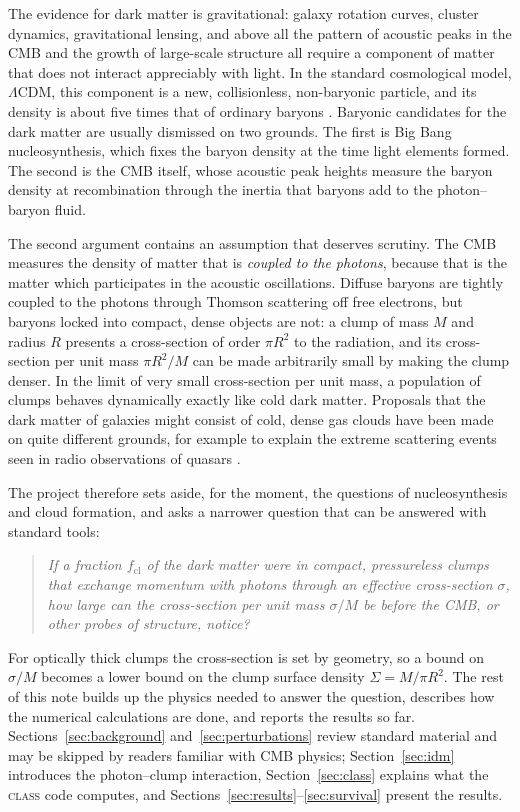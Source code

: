 \documentclass[11pt,a4paper]{article}
\newcommand{\cl}{\mathrm{cl}}
\begin{document}
The evidence for dark matter is gravitational: galaxy rotation curves, cluster dynamics, gravitational lensing, and above all the pattern of acoustic peaks in the CMB and the growth of large-scale structure all require a component of matter that does not interact appreciably with light. In the standard cosmological model, $\Lambda$CDM, this component is a new, collisionless, non-baryonic particle, and its density is about five times that of ordinary baryons \citep{Planck2018}. Baryonic candidates for the dark matter are usually dismissed on two grounds. The first is Big Bang nucleosynthesis, which fixes the baryon density at the time light elements formed. The second is the CMB itself, whose acoustic peak heights measure the baryon density at recombination through the inertia that baryons add to the photon--baryon fluid.

The second argument contains an assumption that deserves scrutiny. The CMB measures the density of matter that is \emph{coupled to the photons}, because that is the matter which participates in the acoustic oscillations. Diffuse baryons are tightly coupled to the photons through Thomson scattering off free electrons, but baryons locked into compact, dense objects are not: a clump of mass $M$ and radius $R$ presents a cross-section of order $\pi R^2$ to the radiation, and its cross-section per unit mass $\pi R^2/M$ can be made arbitrarily small by making the clump denser. In the limit of very small cross-section per unit mass, a population of clumps behaves dynamically exactly like cold dark matter. Proposals that the dark matter of galaxies might consist of cold, dense gas clouds have been made on quite different grounds, for example to explain the extreme scattering events seen in radio observations of quasars \citep{WalkerWardle1998}.

The project therefore sets aside, for the moment, the questions of nucleosynthesis and cloud formation, and asks a narrower question that can be answered with standard tools:
\begin{quote}
\emph{If a fraction $f_\cl$ of the dark matter were in compact, pressureless clumps that exchange momentum with photons through an effective cross-section $\sigma$, how large can the cross-section per unit mass $\sigma/M$ be before the CMB, or other probes of structure, notice?}
\end{quote}
For optically thick clumps the cross-section is set by geometry, so a bound on $\sigma/M$ becomes a lower bound on the clump surface density $\Sigma = M/\pi R^2$. The rest of this note builds up the physics needed to answer the question, describes how the numerical calculations are done, and reports the results so far. Sections~\ref{sec:background} and~\ref{sec:perturbations} review standard material and may be skipped by readers familiar with CMB physics; Section~\ref{sec:idm} introduces the photon--clump interaction, Section~\ref{sec:class} explains what the \textsc{class} code computes, and Sections~\ref{sec:results}--\ref{sec:survival} present the results.
\end{document}
